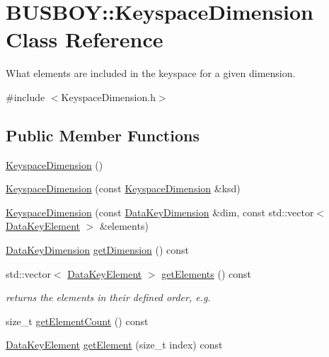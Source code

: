 \hypertarget{classBUSBOY_1_1KeyspaceDimension}{
\section{BUSBOY::KeyspaceDimension Class Reference}
\label{classBUSBOY_1_1KeyspaceDimension}
}


What elements are included in the keyspace for a given dimension.  


{\ttfamily \#include $<$KeyspaceDimension.h$>$}\subsection*{Public Member Functions}
\begin{DoxyCompactItemize}
\item 
\hyperlink{classBUSBOY_1_1KeyspaceDimension_a55af6f7bfa6bd312170c1f86947ccfd7}{KeyspaceDimension} ()
\item 
\hyperlink{classBUSBOY_1_1KeyspaceDimension_a27ca5fae9ad35acbb035846a3b3557d2}{KeyspaceDimension} (const \hyperlink{classBUSBOY_1_1KeyspaceDimension}{KeyspaceDimension} \&ksd)
\item 
\hyperlink{classBUSBOY_1_1KeyspaceDimension_a562028c48d62066cb8ebd75c1310d83b}{KeyspaceDimension} (const \hyperlink{classBUSBOY_1_1DataKeyDimension}{DataKeyDimension} \&dim, const std::vector$<$ \hyperlink{classBUSBOY_1_1DataKeyElement}{DataKeyElement} $>$ \&elements)
\item 
\hyperlink{classBUSBOY_1_1DataKeyDimension}{DataKeyDimension} \hyperlink{classBUSBOY_1_1KeyspaceDimension_abceed9c7182f44afebf7b8e491224121}{getDimension} () const 
\item 
std::vector$<$ \hyperlink{classBUSBOY_1_1DataKeyElement}{DataKeyElement} $>$ \hyperlink{classBUSBOY_1_1KeyspaceDimension_ad15e4b096758991e184f7eda1e508ea9}{getElements} () const 
\begin{DoxyCompactList}\small\item\em returns the elements in their defined order, e.g. \item\end{DoxyCompactList}\item 
size\_\-t \hyperlink{classBUSBOY_1_1KeyspaceDimension_a6e1b8fdd51cc3437e35e3f65162c053f}{getElementCount} () const 
\item 
\hyperlink{classBUSBOY_1_1DataKeyElement}{DataKeyElement} \hyperlink{classBUSBOY_1_1KeyspaceDimension_a9dd72c349a2aed3cc8c2ff500986d269}{getElement} (size\_\-t index) const 

\end{DoxyCompactItemize}
